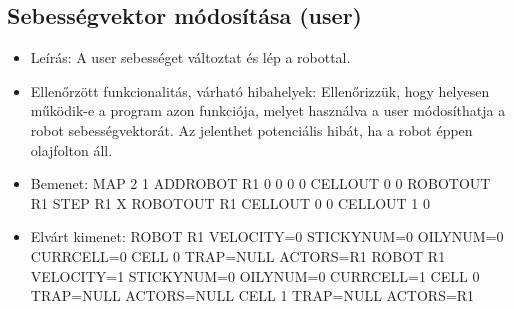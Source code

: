 \subsection{Sebességvektor módosítása (user)}
\begin{itemize}
	\item Leírás: \newline
 A user sebességet változtat és lép a robottal.

	\item Ellenőrzött funkcionalitás, várható hibahelyek: \newline
Ellenőrizzük, hogy helyesen működik-e a program azon funkciója, melyet használva a user módosíthatja a robot sebességvektorát. Az jelenthet potenciális hibát, ha a robot éppen olajfolton áll.

	\item Bemenet: \newline
MAP 2 1  \newline
ADDROBOT R1 0 0 0 0 \newline
CELLOUT 0 0 \newline
ROBOTOUT R1 \newline 
STEP R1 X \newline
ROBOTOUT R1 \newline
CELLOUT 0 0 \newline
CELLOUT 1 0

	
	\item Elvárt kimenet: \newline
ROBOT R1 VELOCITY=0 STICKYNUM=0 OILYNUM=0 CURRCELL=0 \newline
CELL 0 TRAP=NULL ACTORS=R1 \newline
ROBOT R1 VELOCITY=1 STICKYNUM=0 OILYNUM=0 CURRCELL=1 \newline
CELL 0 TRAP=NULL ACTORS=NULL \newline
CELL 1 TRAP=NULL ACTORS=R1 \newline

	
\end{itemize}


